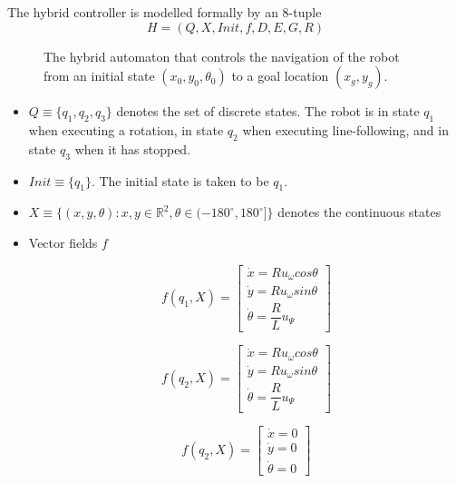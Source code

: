 The hybrid controller is modelled formally by an 8-tuple
$$H=(Q,X,Init,f,D,E,G,R)$$


\begin{figure}[H]\centering
  \scalebox{0.7}{}
  \caption{The hybrid automaton that controls the navigation of the robot
    from an initial state $(x_0, y_0, \theta_0)$ to a goal location $(x_g, y_g)$.}
  \label{}
\end{figure}

\begin{itemize}

\item
  $Q \equiv \{q_1 ,q_2 ,q_3\}$ denotes the set of discrete states. The robot is in
  state $q_1$ when executing a rotation, in state $q_2$ when executing
  line-following, and in state $q_3$ when it has stopped.

\item
  $Init \equiv \{q_1\}$. The initial state is taken to be $q_1$.

\item
  $X \equiv \{(x,y,\theta): x,y \in \mathbb{R}^2, \theta \in(-180^{\circ}, 180^{\circ}] \}$
  denotes the continuous states

\item
  Vector fields $f$

  \begin{equation*}
    f(q_1, X) =
    \begin{bmatrix}
      \dot{x} = R u_{\omega} cos\theta      \\
      \dot{y} = R u_{\omega} sin\theta      \\
      \dot{\theta} = \dfrac{R}{L} u_{\Psi}
    \end{bmatrix}
  \end{equation*}

  \begin{equation*}
    f(q_2, X) =
    \begin{bmatrix}
      \dot{x} = R u_{\omega} cos\theta      \\
      \dot{y} = R u_{\omega} sin\theta      \\
      \dot{\theta} = \dfrac{R}{L} u_{\Psi}
    \end{bmatrix}
  \end{equation*}

  \begin{equation*}
    f(q_2, X) =
    \begin{bmatrix}
      \dot{x} = 0       \\
      \dot{y} = 0       \\
      \dot{\theta} = 0
    \end{bmatrix}
  \end{equation*}


\end{itemize}
